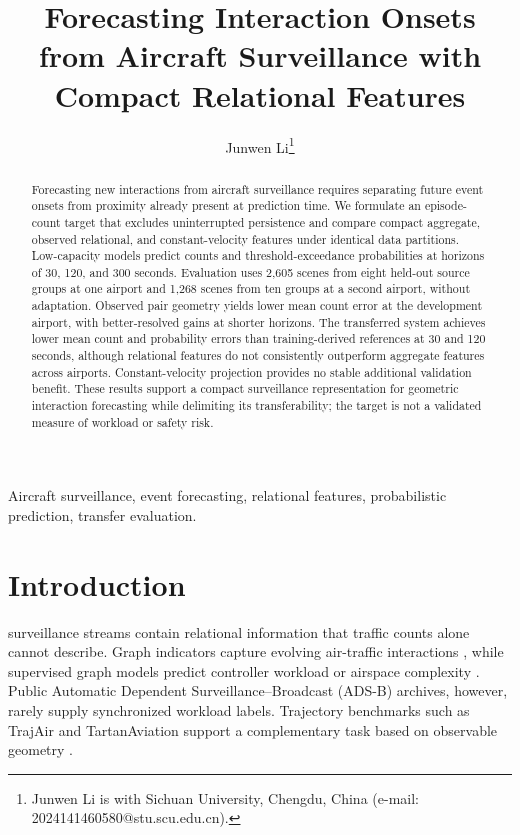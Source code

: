 \documentclass[10pt,journal,letterpaper]{IEEEtran}
\title{Forecasting Interaction Onsets from Aircraft Surveillance with Compact Relational Features}
\author{Junwen Li\thanks{Junwen Li is with Sichuan University, Chengdu, China (e-mail: 2024141460580@stu.scu.edu.cn).}}
\begin{document}
\maketitle
\begin{abstract}
Forecasting new interactions from aircraft surveillance requires separating future event onsets from proximity already present at prediction time. We formulate an episode-count target that excludes uninterrupted persistence and compare compact aggregate, observed relational, and constant-velocity features under identical data partitions. Low-capacity models predict counts and threshold-exceedance probabilities at horizons of 30, 120, and 300 seconds. Evaluation uses 2,605 scenes from eight held-out source groups at one airport and 1,268 scenes from ten groups at a second airport, without adaptation. Observed pair geometry yields lower mean count error at the development airport, with better-resolved gains at shorter horizons. The transferred system achieves lower mean count and probability errors than training-derived references at 30 and 120 seconds, although relational features do not consistently outperform aggregate features across airports. Constant-velocity projection provides no stable additional validation benefit. These results support a compact surveillance representation for geometric interaction forecasting while delimiting its transferability; the target is not a validated measure of workload or safety risk.
\end{abstract}
\begin{IEEEkeywords}
Aircraft surveillance, event forecasting, relational features, probabilistic prediction, transfer evaluation.
\end{IEEEkeywords}

\section{Introduction}
 surveillance streams contain relational information that traffic counts alone cannot describe. Graph indicators capture evolving air-traffic interactions \cite{isufaj2021spatiotemporal}, while supervised graph models predict controller workload or airspace complexity \cite{pang2023workload,li2024mastgnn}. Public Automatic Dependent Surveillance--Broadcast (ADS-B) archives, however, rarely supply synchronized workload labels. Trajectory benchmarks such as TrajAir and TartanAviation support a complementary task based on observable geometry \cite{patrikar2022trajair,patrikar2025tartanaviation}.
\end{document}

